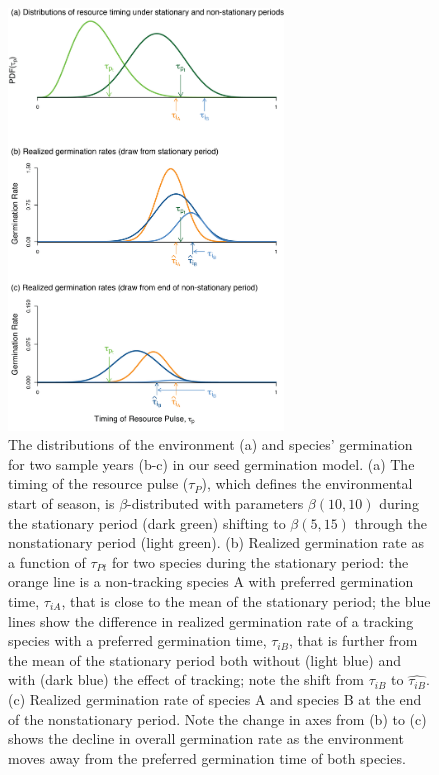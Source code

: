 \documentclass[11pt,letterpaper]{article}
\begin{document}
\begin{figure}[t!]
\centering
\includegraphics[width=0.65\textwidth]{..//..//R/graphs/conceptual/TauP_GerminationAdj.png} 
\caption{The distributions of the environment (a) and species' germination for two sample years (b-c) in our seed germination model. (a) The timing of the resource pulse ($\tau_P$), which defines the environmental start of season, is $\beta$-distributed with parameters $\beta(10,10)$ during the stationary period (dark green) shifting to $\beta (5,15)$ through the nonstationary period (light green). (b) Realized germination rate as a function of $\tau_{Pt}$ for two species during the stationary period: the orange line is a non-tracking species A with preferred germination time, $\tau_{iA}$, that is close to the mean of the stationary period; the blue lines show the difference in realized germination rate of a tracking species with a preferred germination time, $\tau_{iB}$, that is further from the mean of the stationary period both without (light blue) and with (dark blue) the effect of tracking; note the shift from $\tau_{iB}$ to $\hat{\tau_{iB}}$. (c) Realized germination rate of species A and species B at the end of the nonstationary period. Note the change in axes from (b) to (c) shows the decline in overall germination rate as the environment moves away from the preferred germination time of both species.} %

\label{fig:concept}
\end{figure}
\end{document}
